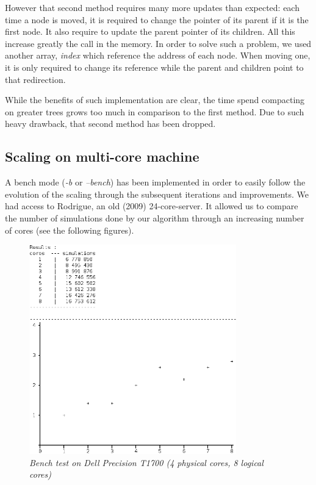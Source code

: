 However that second method requires many more updates than expected: 
each time a node is moved, it is required to change the pointer of its parent if it is the first node. It also require to update the parent pointer of its children. All this increase greatly the call in the memory. In order to solve such a problem, we used another array, \textit{index} which reference the address of each node. When moving one, it is only required to change its reference while the parent and children point to that redirection.

While the benefits of such implementation are clear, the time spend compacting on greater trees grows too much in comparison to the first method. Due to such heavy drawback, that second method has been dropped.

\subsection{Scaling on multi-core machine}

A bench mode (\textit{-b} or \textit{--bench}) has been implemented in order to easily follow the evolution of the scaling through the subsequent iterations and improvements. We had access to Rodrigue, an old (2009) 24-core-server. It allowed us to compare the number of simulations done by our algorithm through an increasing number of cores (see the following figures).

\begin{figure}[H] 
\centerline{\includegraphics[width=0.8\textwidth]{Optimisations/bench_T1700.png}}
\caption{\label{fig:Defrag}\textit{Bench test on Dell Precision T1700 (4 physical cores, 8 logical cores)}}
\end{figure}

